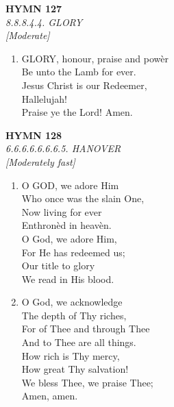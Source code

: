 \newpage
\begin{center}
    {\Large \textbf{HYMN 127}}
    \\
    \textit{8.8.8.4.4. GLORY}
    \\
    \textit{\small [Moderate]}
\end{center}
\vspace{1em}

\begin{enumerate}
    \item GLORY, honour, praise and pow\`er \\
        Be unto the Lamb for ever. \\
        Jesus Christ is our Redeemer, \\
        Hallelujah! \\
        Praise ye the Lord! Amen.

\end{enumerate}

\newpage
\begin{center}
    {\Large \textbf{HYMN 128}}
    \\
    \textit{6.6.6.6.6.6.6.5. HANOVER}
    \\
    \textit{\small [Moderately fast]}
\end{center}
\vspace{1em}

\begin{enumerate}
    \item O GOD, we adore Him \\
        Who once was the slain One, \\
        Now living for ever \\
        Enthron\`ed in heav\`en. \\
        O God, we adore Him, \\
        For He has redeemed us; \\
        Our title to glory \\
        We read in His blood.

    \item O God, we acknowledge \\
        The depth of Thy riches, \\
        For of Thee and through Thee \\
        And to Thee are all things. \\
        How rich is Thy mercy, \\
        How great Thy salvation! \\
        We bless Thee, we praise Thee; \\
        Amen, amen.

\end{enumerate}

